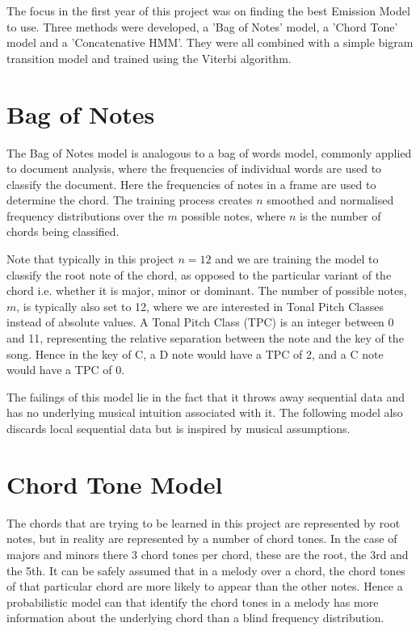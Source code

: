 \documentclass[bsc,singlespacing,logo, parskip, deptreport]{infthesis}
\begin{document}
The focus in the first year of this project was on finding the best Emission Model to use. Three methods were developed, a 'Bag of Notes' model, a 'Chord Tone' model and a 'Concatenative HMM'. They were all combined with a simple bigram transition model and trained using the Viterbi algorithm.

\section{Bag of Notes}

The Bag of Notes model is analogous to a bag of words model, commonly applied to document analysis, where the frequencies of individual words are used to classify the document. Here the frequencies of notes in a frame are used to determine the chord. The training process creates $n$ smoothed and normalised frequency distributions over the $m$ possible notes, where $n$ is the number of chords being classified. 

Note that typically in this project $n = 12$ and we are training the model to classify the root note of the chord, as opposed to the particular variant of the chord i.e. whether it is major, minor or dominant. The number of possible notes, $m$, is typically also set to 12, where we are interested in Tonal Pitch Classes instead of absolute values. A Tonal Pitch Class (TPC) is an integer between 0 and 11, representing the relative separation between the note and the key of the song. Hence in the key of C, a D note would have a TPC of 2, and a C note would have a TPC of 0.

The failings of this model lie in the fact that it throws away sequential data and has no underlying musical intuition associated with it. The following model also discards local sequential data but is inspired by musical assumptions.

\section{Chord Tone Model}

The chords that are trying to be learned in this project are represented by root notes, but in reality are represented by a number of chord tones. In the case of majors and minors there 3 chord tones per chord, these are the root, the 3rd and the 5th. It can be safely assumed that in a melody over a chord, the chord tones of that particular chord are more likely to appear than the other notes. Hence a probabilistic model can that identify the chord tones in a melody has more information about the underlying chord than a blind frequency distribution.
\end{document}
